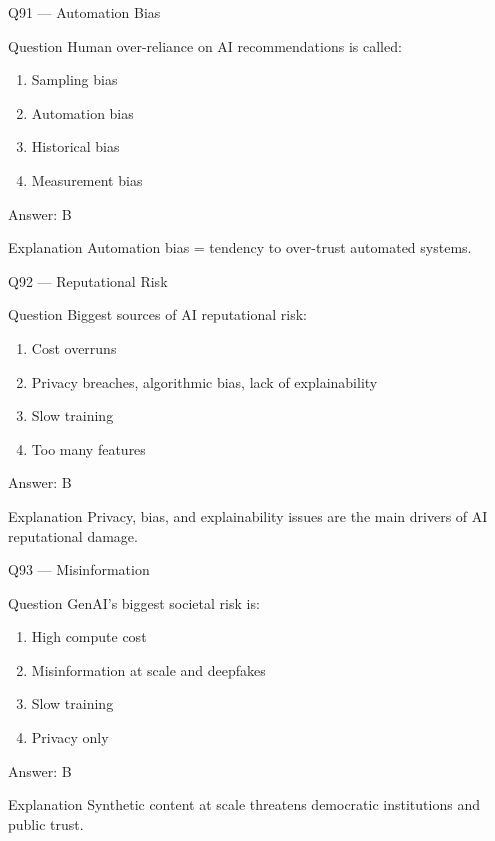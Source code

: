 \documentclass[aspectratio=169,8pt]{beamer}
\begin{document}
	\begin{frame}{Q91 --- Automation Bias}
		\begin{block}{Question}
			Human over-reliance on AI recommendations is called:
		\end{block}
		\begin{enumerate}
			\item Sampling bias
			\item Automation bias
			\item Historical bias
			\item Measurement bias
		\end{enumerate}
		\begin{exampleblock}{Answer: B}\end{exampleblock}
		\begin{block}{Explanation}
			Automation bias = tendency to over-trust automated systems.
		\end{block}
	\end{frame}
	
	\begin{frame}{Q92 --- Reputational Risk}
		\begin{block}{Question}
			Biggest sources of AI reputational risk:
		\end{block}
		\begin{enumerate}
			\item Cost overruns
			\item Privacy breaches, algorithmic bias, lack of explainability
			\item Slow training
			\item Too many features
		\end{enumerate}
		\begin{exampleblock}{Answer: B}\end{exampleblock}
		\begin{block}{Explanation}
			Privacy, bias, and explainability issues are the main drivers of AI reputational damage.
		\end{block}
	\end{frame}
	
	\begin{frame}{Q93 --- Misinformation}
		\begin{block}{Question}
			GenAI's biggest societal risk is:
		\end{block}
		\begin{enumerate}
			\item High compute cost
			\item Misinformation at scale and deepfakes
			\item Slow training
			\item Privacy only
		\end{enumerate}
		\begin{exampleblock}{Answer: B}\end{exampleblock}
		\begin{block}{Explanation}
			Synthetic content at scale threatens democratic institutions and public trust.
		\end{block}
	\end{frame}
	
\end{document}
